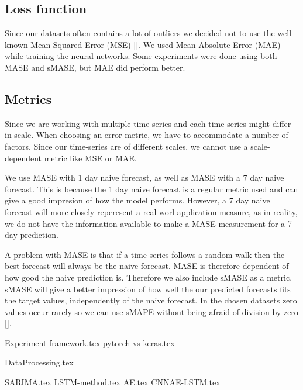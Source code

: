 \subsection*{Loss function}
Since our datasets often contains a lot of outliers we decided not to use the well known
Mean Squared Error (MSE) [].
We used Mean Absolute Error (MAE) while training the neural networks.
Some experiments were done using both MASE and sMASE, but MAE did perform better.

\subsection*{Metrics}
Since we are working with multiple time-series and each time-series might differ in scale.
When choosing an error metric, we have to accommodate a number of factors.
Since our time-series are of different scales, we cannot use a scale-dependent metric
like MSE or MAE.


We use MASE with 1 day naive forecast, as well as MASE with a 7 day
naive forecast. This is because the 1 day naive forecast is a regular metric used
and can give a good impresion of how the model performs.
However, a 7 day naive forecast will more closely reperesent a real-worl application measure,
as in reality, we do not have the information available to make a MASE measurement for a 7 day prediction.

A problem with MASE is that if a time series follows a random walk
then the best forecast will always be the naive forecast. MASE is therefore dependent of
how good the naive prediction is.
Therefore we also include sMASE as a metric.
sMASE will give a better impression of how well the our predicted forecasts fits the target values,
independently of the naive forecast.
In the chosen datasets zero values occur rarely so we can use sMAPE without
being afraid of division by zero [].


{Experiment-framework.tex}
{pytorch-vs-keras.tex}

{DataProcessing.tex}


{SARIMA.tex}
{LSTM-method.tex}
{AE.tex}
{CNNAE-LSTM.tex}
